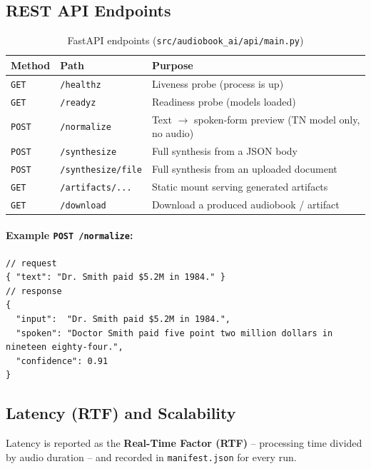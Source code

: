 \documentclass[12pt,a4paper]{article}
\begin{document}
\subsection{REST API Endpoints}

\begin{table}[H]
\centering
\caption{FastAPI endpoints (\texttt{src/audiobook\_ai/api/main.py})}
\small
\begin{tabularx}{\linewidth}{@{} l l L @{}}
\toprule
\textbf{Method} & \textbf{Path} & \textbf{Purpose} \\
\midrule
\texttt{GET} & \texttt{/healthz} & Liveness probe (process is up) \\
\texttt{GET} & \texttt{/readyz} & Readiness probe (models loaded) \\
\texttt{POST} & \texttt{/normalize} & Text $\rightarrow$ spoken-form preview (TN model only, no audio) \\
\texttt{POST} & \texttt{/synthesize} & Full synthesis from a JSON body \\
\texttt{POST} & \texttt{/synthesize/file} & Full synthesis from an uploaded document \\
\texttt{GET} & \texttt{/artifacts/...} & Static mount serving generated artifacts \\
\texttt{GET} & \texttt{/download} & Download a produced audiobook / artifact \\
\bottomrule
\end{tabularx}
\end{table}

\paragraph{Example \texttt{POST /normalize}:}
\begin{lstlisting}[basicstyle=\ttfamily\footnotesize]
// request
{ "text": "Dr. Smith paid $5.2M in 1984." }
// response
{
  "input":  "Dr. Smith paid $5.2M in 1984.",
  "spoken": "Doctor Smith paid five point two million dollars in nineteen eighty-four.",
  "confidence": 0.91
}
\end{lstlisting}

\subsection{Latency (RTF) and Scalability}

Latency is reported as the \textbf{Real-Time Factor (RTF)} -- processing time divided by audio duration -- and recorded in \texttt{manifest.json} for every run.
\end{document}

